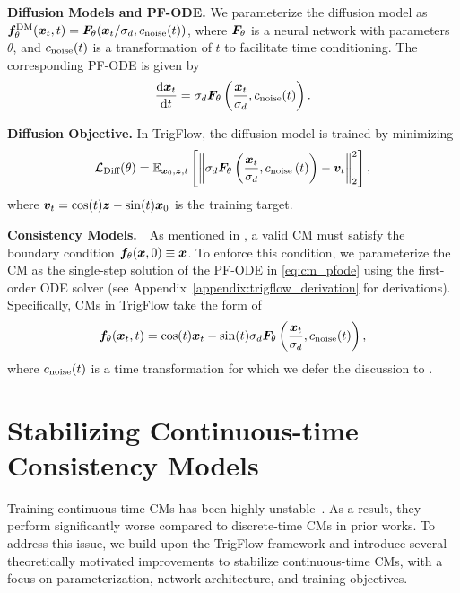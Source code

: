 \textbf{Diffusion Models and PF-ODE. }
We parameterize the diffusion model as ${\bm{f}}^{\text{DM}}_\theta({\bm{x}}_t,t) = {\bm{F}}_\theta({\bm{x}}_t / \sigma_d, c_{\text{noise}}(t))$, where ${\bm{F}}_\theta$ is a neural network with parameters $\theta$, and $c_{\text{noise}}(t)$ is a transformation of $t$ to facilitate time conditioning. The corresponding PF-ODE is given by
\begin{equation}
    \frac{\mathrm{d} {\bm{x}}_t}{\mathrm{d} t} = \sigma_d {\bm{F}}_\theta\left(\frac{{\bm{x}}_t}{\sigma_d }, c_{\text{noise}}(t)\right). \label{eq:cm_pfode}
\end{equation}

\textbf{Diffusion Objective. }
In TrigFlow, the diffusion model is trained by minimizing
\begin{equation}
\label{eq:objective_trigflow}
    {\mathcal{L}}_{\text{Diff}}(\theta) = \mathbb{E}_{{\bm{x}}_0,{\bm{z}},t}\left[
        \left\| \sigma_d{\bm{F}}_\theta\left(\frac{{\bm{x}}_t}{\sigma_d}, c_{\text{noise}}\left(t\right)\right)
        - {\bm{v}}_t
        \right\|_2^2
    \right],
\end{equation}
where ${\bm{v}}_t = \cos(t) {\bm{z}} - \sin(t) {\bm{x}}_0$ is the training target.



\textbf{Consistency Models.}~~As mentioned in , a valid CM must satisfy the boundary condition ${\bm{f}}_\theta({\bm{x}}, 0) \equiv {\bm{x}}$. To enforce this condition, we parameterize the CM as the single-step solution of the PF-ODE in \eqref{eq:cm_pfode} using the first-order ODE solver (see Appendix~\ref{appendix:trigflow_derivation} for derivations). Specifically, CMs in TrigFlow take the form of
\begin{equation}
\label{eq:trigflow_cm}
    {\bm{f}}_\theta({\bm{x}}_t,t) = \cos(t){\bm{x}}_t - \sin(t)\sigma_d {\bm{F}}_\theta\left( \frac{{\bm{x}}_t}{\sigma_d}, c_{\text{noise}}(t) \right),
\end{equation}
where $c_{\text{noise}}(t)$ is a time transformation for which we defer the discussion to . 



\section{Stabilizing Continuous-time Consistency Models}
\label{sec:stabilizing}

Training continuous-time CMs has been highly unstable~\citep{song2023cm,geng2024ect}. As a result, they perform significantly worse compared to discrete-time CMs in prior works. To address this issue, we build upon the TrigFlow framework and introduce several theoretically motivated improvements to stabilize continuous-time CMs, with a focus on parameterization, network architecture, and training objectives.

